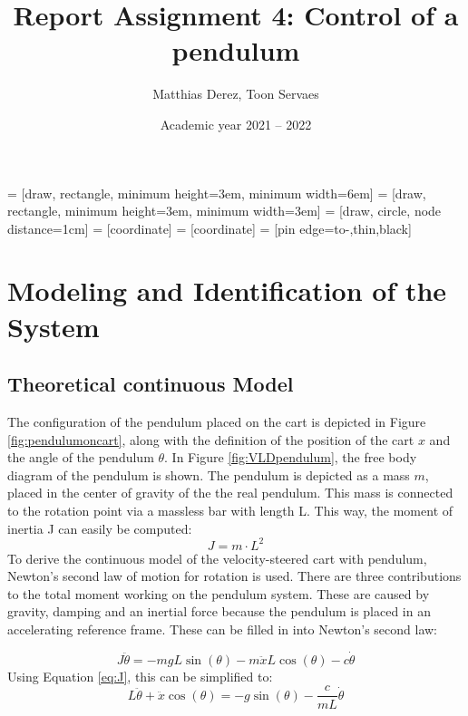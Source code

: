 \documentclass[a4paper,kul]{kulakarticle} %
\date{Academic year 2021 -- 2022}
\title{Report Assignment 4: Control of a pendulum}
\author{Matthias Derez, Toon Servaes}
\begin{document}
\maketitle

\tableofcontents
\listoffigures
\listoftables
{} = [draw, rectangle, 
minimum height=3em, minimum width=6em]
 = [draw, rectangle, 
minimum height=3em, minimum width=3em]
 = [draw, circle, node distance=1cm]
 = [coordinate]
 = [coordinate]
 = [pin edge={to-,thin,black}]


\newpage

\section{Modeling and Identification of the System}
\subsection{Theoretical continuous Model}
The configuration of the pendulum placed on the cart is depicted in Figure \ref{fig:pendulumoncart}, along with the definition of the position of the cart $x$ and the angle of the pendulum $\theta$. In Figure \ref{fig:VLDpendulum}, the free body diagram of the pendulum is shown. The pendulum is depicted as a mass $m$, placed in the center of gravity of the the real pendulum. This mass is connected to the rotation point via a massless bar with length L. This way, the moment of inertia J can easily be computed: 
\begin{equation}
	J = m \cdot L^2
	\label{eq:J}
\end{equation}
To derive the continuous model of the velocity-steered cart with pendulum, Newton's second law of motion for rotation is used. There are three contributions to the total moment working on the pendulum system. These are caused by gravity, damping and an inertial force because the pendulum is placed in an accelerating reference frame. These can be filled in into Newton's second law:

\begin{equation}
	J\ddot{\theta}=-mgL\sin(\theta) - m\ddot{x}L\cos(\theta) - c\dot{\theta}
\end{equation}
Using Equation \ref{eq:J}, this can be simplified to:
\begin{equation}
	L\ddot{\theta}+\ddot{x}\cos(\theta) = -g\sin(\theta) - \frac{c}{mL}\dot{\theta}
	\label{eq:newton}
\end{equation}
\end{document}
